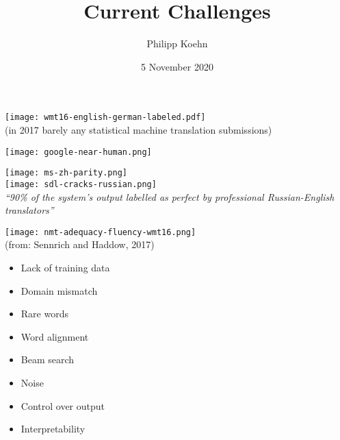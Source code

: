 \documentclass[landscape]{jhuslides3C}
\begin{document}
 \rm
\title[Machine Translation: Current Challenges]{Current Challenges}
\author[Philipp Koehn]{Philipp Koehn}
\date{5 November 2020}
\maketitle


\vfill
\begin{center}
\texttt{[image: wmt16-english-german-labeled.pdf]}\\[3mm]
(in 2017 barely any statistical machine translation submissions)
\end{center}
\vfill



\vfill
\begin{center}
\texttt{[image: google-near-human.png]}
\end{center}
\vfill


\vfill
\begin{center}
\texttt{[image: ms-zh-parity.png]}\\[1cm]
\texttt{[image: sdl-cracks-russian.png]}\\
{\em \small ``90\% of the system's output labelled as perfect by professional Russian-English translators''}
\end{center}
\vfill


\vfill
\begin{center}
\texttt{[image: nmt-adequacy-fluency-wmt16.png]}\\[1cm]
(from: Sennrich and Haddow, 2017)
\end{center}
\vfill


\vfill
\begin{itemize}
\item Lack of training data
\item Domain mismatch
\item Rare words
\item Word alignment
\item Beam search
\item Noise
\item Control over output
\item Interpretability
\end{itemize}
\vfill
\end{document}
